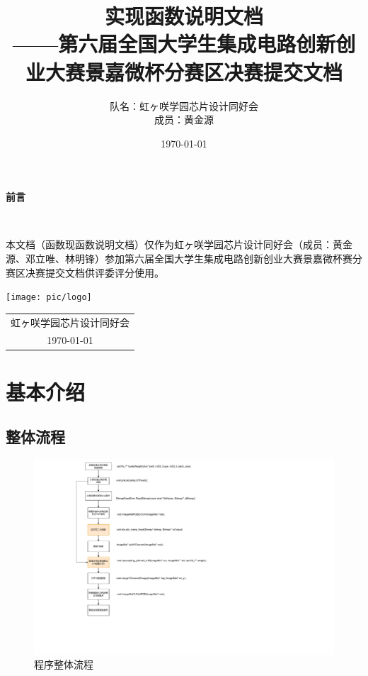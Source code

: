 \documentclass[12pt, a4paper, oneside]{ctexbook}
\title{{\Huge{\textbf{实现函数说明文档}}}\normalsize{\\——第六届全国大学生集成电路创新创业大赛景嘉微杯分赛区决赛提交文档}}
\author{队名：虹ヶ咲学园芯片设计同好会\\ 成员：黄金源\space邓立唯\space林明锋}
\date{\today}
\begin{document}
	
	\maketitle	
	\setcounter{page}{1}
	\begin{center}
		\Huge\textbf{前言}
	\end{center}~\

本文档（函数现函数说明文档）仅作为虹ヶ咲学园芯片设计同好会（成员：黄金源、邓立唯、林明锋）参加第六届全国大学生集成电路创新创业大赛景嘉微杯赛分赛区决赛提交文档供评委评分使用。
	~\\
	\begin{flushright}
		\texttt{[image: pic/logo]}\\
		\begin{tabular}{c}
			虹ヶ咲学园芯片设计同好会\\
			\today
		\end{tabular}
	\end{flushright}
	\newpage
	\setcounter{page}{1}
	\tableofcontents
	\newpage
	\setcounter{page}{1}
	
	\chapter{基本介绍}
	\section{整体流程}
		\begin{figure}[h]
			\centering
			\includegraphics[scale=0.65]{pic/overview}
			\caption{程序整体流程}
			\label{fig:overview}
		\end{figure}
\end{document}

